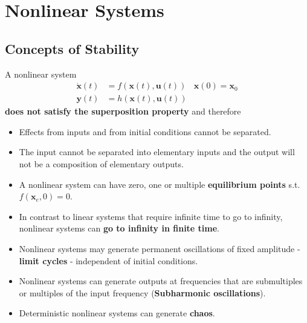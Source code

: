 \section{Nonlinear Systems}

\subsection{Concepts of Stability}
A nonlinear system
\noindent\begin{align*}
    \dot{\mathbf{x}}(t) & = f(\mathbf{x}(t), \mathbf{u}(t)) & \mathbf{x}(0)=\mathbf{x}_0 \\
    \mathbf{y}(t)       & = h(\mathbf{x}(t), \mathbf{u}(t))
\end{align*}
\textbf{does not satisfy the superposition property} and therefore
\begin{itemize}
    \item Effects from inputs and from initial conditions cannot be separated.
    \item The input cannot be separated into elementary inputs and the output will not be a composition of elementary outputs.
\end{itemize}

\newpar{}
\begin{itemize}
    \item A nonlinear system can have zero, one or multiple \textbf{equilibrium points} s.t.\ $f(\mathbf{x}_e, 0)=0$.
    \item In contrast to linear systems that require infinite time to go to infinity, nonlinear systems can \textbf{go to infinity in finite time}.
    \item Nonlinear systems may generate permanent oscillations of fixed amplitude - \textbf{limit cycles} - independent of initial conditions.
    \item Nonlinear systems can generate outputs at frequencies that are submultiples or multiples of the input frequency (\textbf{Subharmonic oscillations}).
    \item Deterministic nonlinear systems can generate \textbf{chaos}.
\end{itemize}

